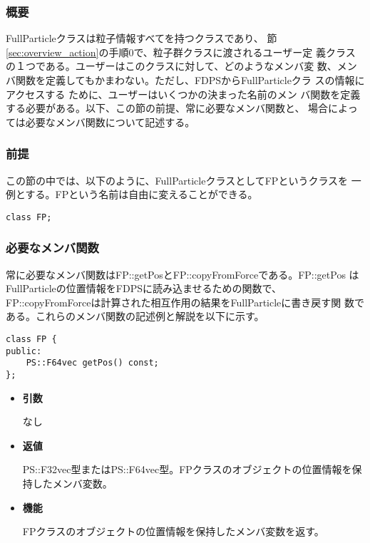 \subsubsection{概要}

FullParticleクラスは粒子情報すべてを持つクラスであり、
節\ref{sec:overview_action}の手順0で、粒子群クラスに渡されるユーザー定
義クラスの１つである。ユーザーはこのクラスに対して、どのようなメンバ変
数、メンバ関数を定義してもかまわない。ただし、FDPSからFullParticleクラ
スの情報にアクセスする ために、ユーザーはいくつかの決まった名前のメン
バ関数を定義する必要がある。以下、この節の前提、常に必要なメンバ関数と、
場合によっては必要なメンバ関数について記述する。

\subsubsection{前提}

この節の中では、以下のように、FullParticleクラスとしてFPというクラスを
一例とする。FPという名前は自由に変えることができる。
\begin{screen}
\begin{verbatim}
class FP;
\end{verbatim}
\end{screen}

\subsubsection{必要なメンバ関数}


常に必要なメンバ関数はFP::getPosとFP::copyFromForceである。FP::getPos
はFullParticleの位置情報をFDPSに読み込ませるための関数で、
FP::copyFromForceは計算された相互作用の結果をFullParticleに書き戻す関
数である。これらのメンバ関数の記述例と解説を以下に示す。


\begin{screen}
\begin{verbatim}
class FP {
public:
    PS::F64vec getPos() const;
};
\end{verbatim}
\end{screen}

\begin{itemize}

\item {\bf 引数}

  なし
  
\item {\bf 返値}

  PS::F32vec型またはPS::F64vec型。FPクラスのオブジェクトの位置情報を保
  持したメンバ変数。
  
\item {\bf 機能}

  FPクラスのオブジェクトの位置情報を保持したメンバ変数を返す。
  
\end{itemize}

